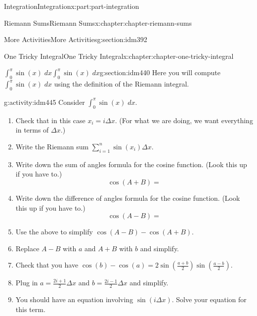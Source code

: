 \documentclass[oneside,10pt,]{book}
\numberwithin{equation}{section}
\begin{document}
\begin{partptx}{Integration}{}{Integration}{}{}{x:part:part-integration}
\begin{chapterptx}{Riemann Sums}{}{Riemann Sums}{}{}{x:chapter:chapter-riemann-sums}
\begin{sectionptx}{More Activities}{}{More Activities}{}{}{g:section:idm392}
\end{sectionptx}
\end{chapterptx}
%
\typeout{************************************************}
\typeout{************************************************}
%
\begin{chapterptx}{One Tricky Integral}{}{One Tricky Integral}{}{}{x:chapter:chapter-one-tricky-integral}
%
%
\typeout{************************************************}
\typeout{************************************************}
%
\begin{sectionptx}{\(\displaystyle \int_0^\pi \sin(x) \; dx\)}{}{\(\displaystyle \int_0^\pi \sin(x) \; dx\)}{}{}{g:section:idm440}
Here you will compute \(\displaystyle \int_0^\pi \sin(x) \; dx\) using the definition of the Riemann integral.%
\begin{activity}{}{g:activity:idm445}%
Consider \(\displaystyle \int_{0}^\pi \sin(x) \; dx\).%
\begin{enumerate}[font=\bfseries,label=(\alph*),ref=\alph*]
\item{}Check that in this case \(x_i = i \Delta x\). (For what we are doing, we want everything in terms of \(\Delta x\).)%
\item{}Write the Riemann sum \(\displaystyle \sum_{i=1}^n \sin(x_i) \Delta x\).%
\item{}Write down the sum of angles formula for the cosine function. (Look this up if you have to.)%
\begin{equation*}
\cos(A+B) = 
\end{equation*}
%
\item{}Write down the difference of angles formula for the cosine function. (Look this up if you have to.)%
\begin{equation*}
\cos(A-B) = 
\end{equation*}
%
\item{}Use the above to simplify \(\cos(A-B) - \cos(A+B)\).%
\item{}Replace \(A-B\) with \(a\) and \(A+B\) with \(b\) and simplify.%
\item{}Check that you have \(\displaystyle \cos(b) - \cos(a) = 2 \sin \left(\frac{a+b}{2}\right) \sin\left(\frac{a-b}{2}\right)\).%
\item{}Plug in \(\displaystyle a = \frac{2i+1}{2} \Delta x\) and \(\displaystyle b = \frac{2i-1}{2}\Delta x\) and simplify.%
\item{}You should have an equation involving \(\sin(i \Delta x)\). Solve your equation for this term.%

\end{enumerate}
\end{activity}
\end{sectionptx}
\end{chapterptx}
\end{partptx}
\end{document}
